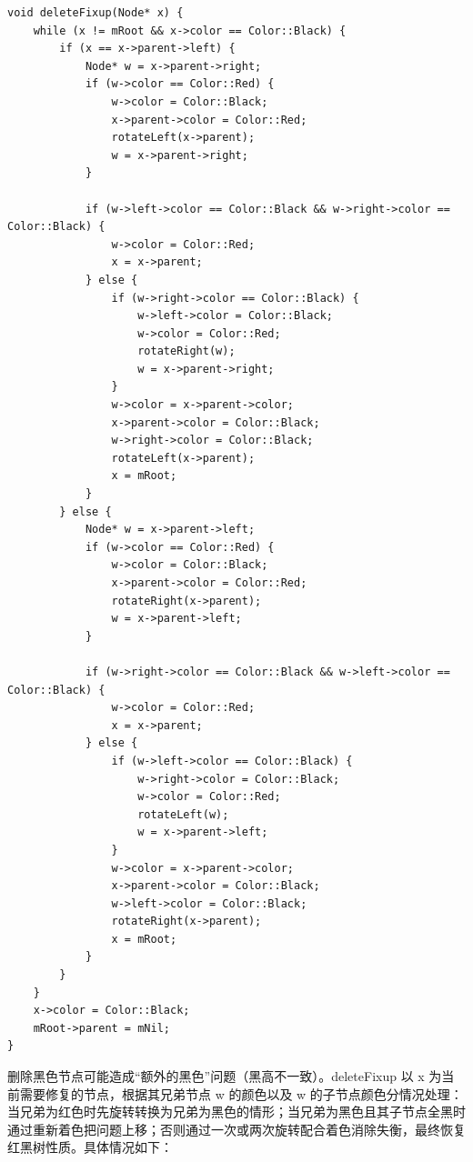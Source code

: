 \documentclass[UTF8,12pt,a4paper]{ctexart}
\begin{document}
\begin{lstlisting}[caption={红黑树删除后的平衡维护（deleteFixup）}]
void deleteFixup(Node* x) {
    while (x != mRoot && x->color == Color::Black) {
        if (x == x->parent->left) {
            Node* w = x->parent->right;
            if (w->color == Color::Red) {
                w->color = Color::Black;
                x->parent->color = Color::Red;
                rotateLeft(x->parent);
                w = x->parent->right;
            }

            if (w->left->color == Color::Black && w->right->color == Color::Black) {
                w->color = Color::Red;
                x = x->parent;
            } else {
                if (w->right->color == Color::Black) {
                    w->left->color = Color::Black;
                    w->color = Color::Red;
                    rotateRight(w);
                    w = x->parent->right;
                }
                w->color = x->parent->color;
                x->parent->color = Color::Black;
                w->right->color = Color::Black;
                rotateLeft(x->parent);
                x = mRoot;
            }
        } else {
            Node* w = x->parent->left;
            if (w->color == Color::Red) {
                w->color = Color::Black;
                x->parent->color = Color::Red;
                rotateRight(x->parent);
                w = x->parent->left;
            }

            if (w->right->color == Color::Black && w->left->color == Color::Black) {
                w->color = Color::Red;
                x = x->parent;
            } else {
                if (w->left->color == Color::Black) {
                    w->right->color = Color::Black;
                    w->color = Color::Red;
                    rotateLeft(w);
                    w = x->parent->left;
                }
                w->color = x->parent->color;
                x->parent->color = Color::Black;
                w->left->color = Color::Black;
                rotateRight(x->parent);
                x = mRoot;
            }
        }
    }
    x->color = Color::Black;
    mRoot->parent = mNil;
}
\end{lstlisting}

删除黑色节点可能造成“额外的黑色”问题（黑高不一致）。deleteFixup 以 x 为当前需要修复的节点，根据其兄弟节点 w 的颜色以及 w 的子节点颜色分情况处理：当兄弟为红色时先旋转转换为兄弟为黑色的情形；当兄弟为黑色且其子节点全黑时通过重新着色把问题上移；否则通过一次或两次旋转配合着色消除失衡，最终恢复红黑树性质。具体情况如下：
\end{document}
